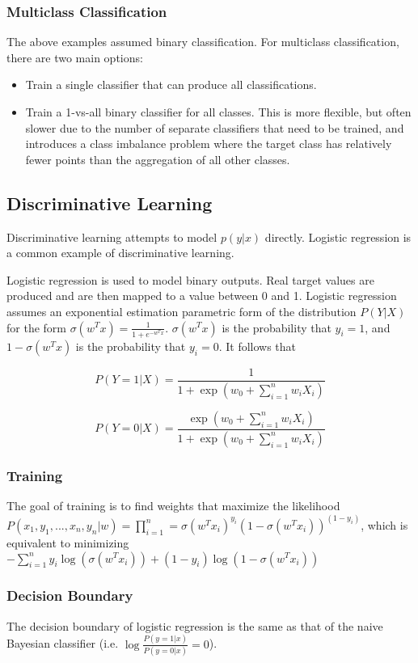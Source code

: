 \documentclass[12pt,titlepage]{article}
\begin{document}
      \subsubsection{Multiclass Classification}
        The above examples assumed binary classification. For multiclass classification, there are two main options:
        \begin{itemize}
          \item Train a single classifier that can produce all classifications.
          \item Train a 1-vs-all binary classifier for all classes. This is more flexible, but often slower due to the number of separate classifiers
            that need to be trained, and introduces a class imbalance problem where the target class has relatively fewer points than the aggregation of
            all other classes.
        \end{itemize}

    \subsection{Discriminative Learning}
      Discriminative learning attempts to model $p(y|x)$ directly. Logistic regression is a common example of discriminative learning.

      Logistic regression is used to model binary outputs. Real target values are produced and are then mapped to a value between 0 and 1. Logistic
      regression assumes an exponential estimation parametric form of the distribution $P(Y|X)$ for the form $\sigma(w^Tx) = \frac{1}{1 + e^{-w^Tx}}$.
      $\sigma(w^Tx)$ is the probability that $y_i = 1$, and $1 - \sigma(w^Tx)$ is the probability that $y_i = 0$. It follows that

      $$P(Y=1|X) = \frac{1}{1 + \exp{(w_0 + \sum_{i=1}^n w_i X_i)}}$$

      $$P(Y=0|X) = \frac{\exp{(w_0 + \sum_{i=1}^n w_i X_i)}}{1 + \exp{(w_0 + \sum_{i=1}^n w_i X_i)}}$$

      \subsubsection{Training}
        The goal of training is to find weights that maximize the likelihood $P(x_1, y_1, . . ., x_n, y_n|w) = \prod_{i=1}^n = \sigma(w^Tx_i)^{y_i}(1 - \sigma(w^Tx_i))^{(1 - y_i)}$,
        which is equivalent to minimizing $-\sum_{i=1}^n y_i \log{(\sigma(w^Tx_i))} + (1 - y_i) \log{(1 - \sigma(w^Tx_i))}$

      \subsubsection{Decision Boundary}
        The decision boundary of logistic regression is the same as that of the naive Bayesian classifier (i.e. $\log{\frac{P(y=1|x)}{P(y=0|x)}} = 0$).
\end{document}
